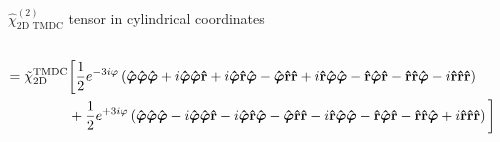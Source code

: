\documentclass[
aspectratio=169,
16pt,
xcolor={dvipsnames} %
]{beamer}
\begin{document}
\begin{frame}{$\hat{\chi}^{(2)}_{\text{2D TMDC}}$ tensor in cylindrical coordinates}
{\begin{align*}
				\\ =
				\tilde{\chi}^{\text{TMDC}}_{\text{2D}} & \bigg[ 
				\frac{1}{2} e^{-3i \varphi} \left( \vu{\boldsymbol{\varphi}} \vu{\boldsymbol{\varphi}} \vu{\boldsymbol{\varphi}} + i \vu{\boldsymbol{\varphi}} \vu{\boldsymbol{\varphi}} \vu{r} + i \vu{\boldsymbol{\varphi}} \vu{r} \vu{\boldsymbol{\varphi}} - \vu{\boldsymbol{\varphi}} \vu{r} \vu{r} + i \vu{r} \vu{\boldsymbol{\varphi}} \vu{\boldsymbol{\varphi}} - \vu{r} \vu{\boldsymbol{\varphi}} \vu{r} - \vu{r} \vu{r} \vu{\boldsymbol{\varphi}} - i \vu{r} \vu{r} \vu{r}\right) 
				\nonumber \\ &
				+ \frac{1}{2} e^{+3i \varphi}\left( \vu{\boldsymbol{\varphi}} \vu{\boldsymbol{\varphi}} \vu{\boldsymbol{\varphi}} - i \vu{\boldsymbol{\varphi}} \vu{\boldsymbol{\varphi}} \vu{r} -i \vu{\boldsymbol{\varphi}} \vu{r} \vu{\boldsymbol{\varphi}} - \vu{\boldsymbol{\varphi}} \vu{r} \vu{r}  - i\vu{r} \vu{\boldsymbol{\varphi}} \vu{\boldsymbol{\varphi}} - \vu{r} \vu{\boldsymbol{\varphi}} \vu{r} - \vu{r} \vu{r} \vu{\boldsymbol{\varphi}} + i \vu{r} \vu{r} \vu{r}\right)
				\bigg]
		\end{align*}}
	\end{frame}
	
\end{document}
